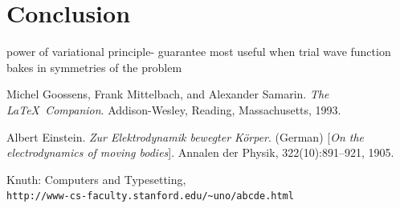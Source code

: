 \documentclass[prb,aps,twocolumn,showpacs,10pt]{revtex4-2}
\begin{document}
\section{Conclusion}

power of variational principle- guarantee
most useful when trial wave function bakes in symmetries of the problem

\begin{thebibliography}{9}
Michel Goossens, Frank Mittelbach, and Alexander Samarin. 
\textit{The \LaTeX\ Companion}. 
Addison-Wesley, Reading, Massachusetts, 1993.

Albert Einstein. 
\textit{Zur Elektrodynamik bewegter K{\"o}rper}. (German) 
[\textit{On the electrodynamics of moving bodies}]. 
Annalen der Physik, 322(10):891–921, 1905.

Knuth: Computers and Typesetting,
\\\texttt{http://www-cs-faculty.stanford.edu/\~{}uno/abcde.html}
\end{thebibliography}
\end{document}
